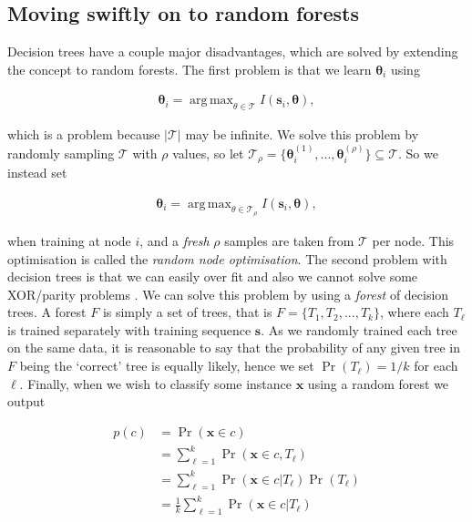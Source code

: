 \documentclass[12pt,twoside,notitlepage]{report}
\newcommand{\vc}[1]{\mathbf{#1}}
\newcommand{\cl}[1]{\mathcal{#1}}
\DeclareMathOperator*{\argmax}{arg\,max}
\begin{document}
        \subsection{Moving swiftly on to random forests} \label{sec:moving_swiftly_onto_forests}
            Decision trees have a couple major disadvantages, which are solved by extending the concept to random 
            forests. The first problem is that we learn $\vc{\theta}_i$ using

            \begin{align} 
                \vc{\theta}_i = \argmax_{\theta\in\cl{T}} I(\vc{s}_i, \vc{\theta}),
            \end{align}

            which is a problem because $|\cl{T}|$ may be infinite. We solve this problem by randomly sampling $\cl{T}$ with 
            $\rho$ values, so let $\cl{T}_\rho = \{ \vc{\theta}_i^{(1)}, ..., \vc{\theta}_i^{(\rho)} \} \subseteq \cl{T}$.
            So we instead set 

            \begin{align} 
                \vc{\theta}_i = \argmax_{\theta\in\cl{T}_\rho} I(\vc{s}_i, \vc{\theta}),
            \end{align}            

            when training at node $i$, and a \textit{fresh} $\rho$ samples are taken from $\cl{T}$ per node. This 
            optimisation is called the \textit{random node optimisation}. The second problem with decision trees is that 
            we can easily over fit and also we cannot solve some XOR/parity problems \cite{criminisi2013decision}. We 
            can solve this problem by using a \textit{forest} of decision trees. A forest $F$ is simply a set of trees, 
            that is $F = \{ T_1, T_2, ..., T_k \}$, where each $T_\ell$ is trained separately with training sequence 
            $\vc{s}$. As we randomly trained each tree on the same data, it is reasonable to say that the probability of 
            any given tree in $F$ being the `correct' tree is equally likely, hence we set $\Pr(T_\ell) = 1/k$ for each 
            $\ell$. Finally, when we wish to classify some instance $\vc{x}$ using a random forest we output 

            \begin{align}
                p(c) & = \Pr(\vc{x} \in c) \\
                    & = \sum_{\ell=1}^k \Pr(\vc{x} \in c, T_\ell) \\
                    & = \sum_{\ell=1}^k \Pr(\vc{x} \in c | T_\ell) \Pr(T_\ell) \\
                    & = \frac{1}{k} \sum_{\ell=1}^k \Pr(\vc{x} \in c | T_\ell)
            \end{align}
\end{document}
